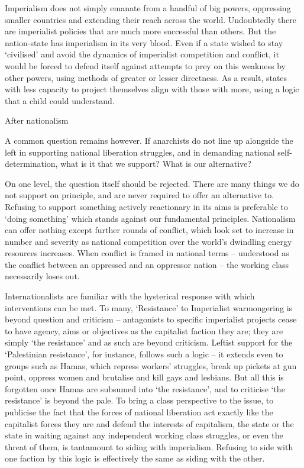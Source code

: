 Imperialism does not simply emanate from a handful of big powers, oppressing smaller countries and extending their reach across the world.
Undoubtedly there are imperialist policies that are much more successful than others.
But the nation-state has imperialism in its very blood.
Even if a state wished to stay ‘civilised’ and avoid the dynamics of imperialist competition and conflict, it would be forced to defend itself against attempts to prey on this weakness by other powers, using methods of greater or lesser directness.
As a result, states with less capacity to project themselves align with those with more, using a logic that a child could understand.

After nationalism

A common question remains however.
If anarchists do not line up alongside the left in supporting national liberation struggles, and in demanding national self-determination, what is it that we support? What is our alternative?

On one level, the question itself should be rejected.
There are many things we do not support on principle, and are never required to offer an alternative to.
Refusing to support something actively reactionary in its aims is preferable to ‘doing something’ which stands against our fundamental principles.
Nationalism can offer nothing except further rounds of conflict, which look set to increase in number and severity as national competition over the world’s dwindling energy resources increases.
When conflict is framed in national terms – understood as the conflict between an oppressed and an oppressor nation – the working class necessarily loses out.

Internationalists are familiar with the hysterical response with which interventions can be met.
To many, ‘Resistance’ to Imperialist warmongering is beyond question and criticism – antagonists to specific imperialist projects cease to have agency, aims or objectives as the capitalist faction they are; they are simply ‘the resistance’ and as such are beyond criticism.
Leftist support for the ‘Palestinian resistance’, for instance, follows such a logic – it extends even to groups such as Hamas, which repress workers’ struggles, break up pickets at gun point, oppress women and brutalise and kill gays and lesbians.
But all this is forgotten once Hamas are subsumed into ‘the resistance’, and to criticise ‘the resistance’ is beyond the pale.
To bring a class perspective to the issue, to publicise the fact that the forces of national liberation act exactly like the capitalist forces they are and defend the interests of capitalism, the state or the state in waiting against any independent working class struggles, or even the threat of them, is tantamount to siding with imperialism.
Refusing to side with one faction by this logic is effectively the same as siding with the other.

